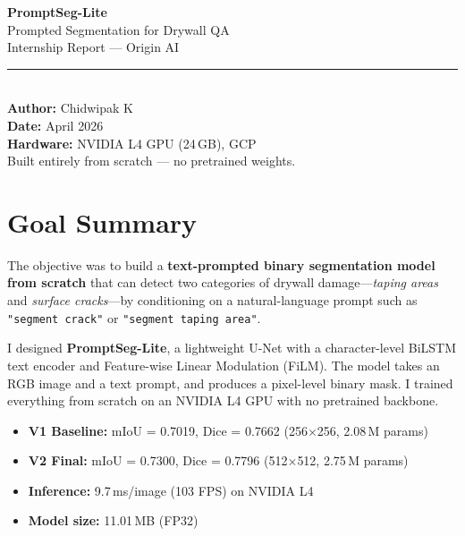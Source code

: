 \documentclass[12pt,a4paper]{article}
\begin{document}
\begin{titlepage}
\centering
\vspace*{2cm}
{\Huge\bfseries\color{originblue} PromptSeg-Lite\\[0.3em]}
{\LARGE Prompted Segmentation for Drywall QA\\[2em]}
{\Large Internship Report --- Origin AI\\[1.5em]}
\rule{0.6\textwidth}{0.5pt}\\[2em]
{\large\textbf{Author:} Chidwipak K\\[0.5em]}
{\large\textbf{Date:} April 2026\\[0.5em]}
{\large\textbf{Hardware:} NVIDIA L4 GPU (24\,GB), GCP\\[3em]}
\vfill
{\small Built entirely from scratch --- no pretrained weights.}
\end{titlepage}

\tableofcontents
\newpage

\section{Goal Summary}

The objective was to build a \textbf{text-prompted binary segmentation model from scratch} that can detect two categories of drywall damage---\emph{taping areas} and \emph{surface cracks}---by conditioning on a natural-language prompt such as \texttt{"segment crack"} or \texttt{"segment taping area"}.

I designed \textbf{PromptSeg-Lite}, a lightweight U-Net with a character-level BiLSTM text encoder and Feature-wise Linear Modulation (FiLM).  The model takes an RGB image and a text prompt, and produces a pixel-level binary mask.  I trained everything from scratch on an NVIDIA L4 GPU with no pretrained backbone.

\begin{tcolorbox}[colback=boxbg, colframe=originblue, title=Key Results]
\begin{itemize}[nosep]
  \item \textbf{V1 Baseline:} mIoU = 0.7019, Dice = 0.7662 (256$\times$256, 2.08\,M params)
  \item \textbf{V2 Final:}   mIoU = 0.7300, Dice = 0.7796 (512$\times$512, 2.75\,M params)
  \item \textbf{Inference:}   9.7\,ms/image (103 FPS) on NVIDIA L4
  \item \textbf{Model size:}  11.01\,MB (FP32)
\end{itemize}
\end{tcolorbox}
\end{document}
